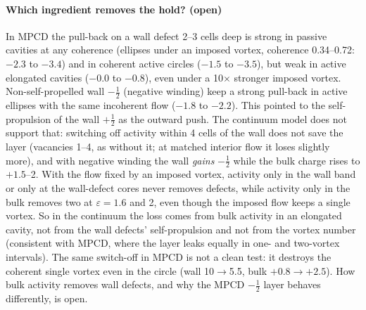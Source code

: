 \documentclass[11pt,a4paper]{article}
\newcommand{\half}{\tfrac12}
\begin{document}
\paragraph{Which ingredient removes the hold? (open)} In MPCD the pull-back on a wall defect 2--3 cells deep is strong in passive cavities at any coherence (ellipses
under an imposed vortex, coherence 0.34--0.72: $-2.3$ to $-3.4$) and in coherent active circles ($-1.5$ to $-3.5$), but weak in active elongated cavities ($-0.0$ to $-0.8$), even under a
10$\times$ stronger imposed vortex. Non-self-propelled wall $-\half$ (negative winding) keep a strong pull-back in active ellipses with the same incoherent flow ($-1.8$ to $-2.2$). This pointed
to the self-propulsion of the wall $+\half$ as the outward push. The continuum model does not support that: switching off activity within 4 cells of the wall does not save the layer
(vacancies 1--4, as without it; at matched interior flow it loses slightly more), and with negative winding the wall \emph{gains} $-\half$ while the bulk charge rises to $+1.5$--2.
With the flow fixed by an imposed vortex, activity only in the wall band or only at the wall-defect cores never removes defects, while activity only in the bulk removes two at
$\varepsilon=1.6$ and 2, even though the imposed flow keeps a single vortex. So in the continuum the loss comes from bulk activity in an elongated cavity, not from the wall defects'
self-propulsion and not from the vortex number (consistent with MPCD, where the layer leaks equally in one- and two-vortex intervals). The same switch-off in MPCD is not a clean test:
it destroys the coherent single vortex even in the circle (wall 10$\to$5.5, bulk $+0.8\to+2.5$). How bulk activity removes wall defects, and why the MPCD $-\half$ layer behaves differently,
is open.
\end{document}
